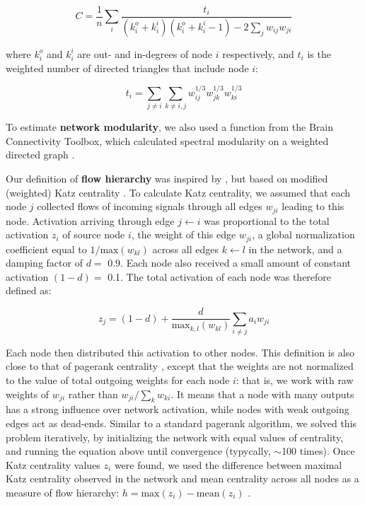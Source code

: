 \documentclass{article}
\begin{document}
\[ C = \frac{1}{n} \sum_i{\frac {t_i}{(k^o_i+k^i_i)(k^o_i+k^i_i-1)-2\sum_j{w_{ij}w_{ji}}}} \]

where $k^o_i$ and $k^i_i$ are out- and in-degrees of node $i$ respectively, and $t_i$ is the weighted number of directed triangles that include node $i$:

\[ t_i = \sum_{j \neq i}{\sum_{k \neq i,j}{w^{1/3}_{ij}w^{1/3}_{jk}w^{1/3}_{ki}}} \]

To estimate \textbf{network modularity}, we also used a function from the Brain Connectivity Toolbox, which calculated spectral modularity on a weighted directed graph \citep{reichardt2006community,leicht2008community}.

Our definition of \textbf{flow hierarchy} was inspired by \citep{mones2012hierarchy,czegel2015hierarchy}, but based on modified (weighted) Katz centrality \citep{katz1953original,fletcher2018katz}. To calculate Katz centrality, we assumed that each node $j$ collected flows of incoming signals through all edges $w_{ji}$ leading to this node. Activation arriving through edge $j\leftarrow i$ was proportional to the total activation $z_i$ of source node $i$, the weight of this edge $w_{ji}$, a global normalization coefficient equal to $1/\text{max}(w_{kl})$ across all edges $k\leftarrow l$ in the network, and a damping factor of $d=$ 0.9. Each node also received a small amount of constant activation $(1-d)=$ 0.1. The total activation of each node was therefore defined as:

\[ z_j = (1-d) + \frac{d}{\text{max}_{k,l}(w_{kl})} \sum_{i \neq j}{a_i w_{ji}} \]

Each node then distributed this activation to other nodes. This definition is also close to that of pagerank centrality \citep{page1999pagerank}, except that the weights are not normalized to the value of total outgoing weights for each node $i$: that is, we work with raw weights of $w_{ji}$ rather than $w_{ji}/\sum_k{w_{ki}}$. It means that a node with many outputs has a strong influence over network activation, while nodes with weak outgoing edges act as dead-ends. Similar to a standard pagerank algorithm, we solved this problem iteratively, by initializing the network with equal values of centrality, and running the equation above until convergence (typycally, $\sim$100 times). Once Katz centrality values $z_i$ were found, we used the difference between maximal Katz centrality observed in the network and mean centrality across all nodes as a measure of flow hierarchy: $h = \text{max}(z_i) - \text{mean}(z_i)$ \citep{mones2012hierarchy,czegel2015hierarchy}.
\end{document}
